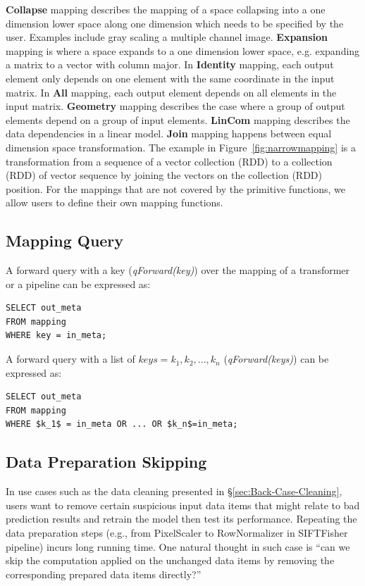 \documentclass{sig-alternate}
\begin{document}
{\bf Collapse} mapping describes the mapping of a space collapsing into a one dimension lower space along one dimension which needs
to be specified by the user. Examples include gray scaling a multiple channel image.
{\bf Expansion} mapping is where a space expands to a one dimension lower space, e.g. expanding a matrix to a vector with column major.
In {\bf Identity} mapping, each output element only depends on one element with the same coordinate in the input matrix.
In {\bf All} mapping, each output element depends on all elements in the input matrix.
{\bf Geometry} mapping describes the case where a group of output elements depend on a group of input elements.
{\bf LinCom} mapping describes the data dependencies in a linear model.
{\bf Join} mapping happens between equal dimension space transformation. The example in Figure~\ref{fig:narrowmapping} 
is a transformation from a sequence of a vector collection (RDD) to a collection (RDD) of vector sequence by joining the vectors
on the collection (RDD) position.
For the mappings that are not covered by the primitive functions, we allow users to define their own mapping functions.

\subsection{Mapping Query}
A forward query with a key  ({\it qForward(key)}) over the mapping of a transformer or a pipeline can be expressed as:
\begin{lstlisting}
SELECT out_meta
FROM mapping
WHERE key = in_meta;
\end{lstlisting}

A forward query with a list of $keys={k_1, k_2, ..., k_n}$ ({\it qForward(keys)}) can be expressed as:
\begin{lstlisting}
SELECT out_meta
FROM mapping
WHERE $k_1$ = in_meta OR ... OR $k_n$=in_meta;
\end{lstlisting}

\subsection{Data Preparation Skipping}
\label{sec:formal-skipping}
In use cases such as the data cleaning presented in \S\ref{sec:Back-Case-Cleaning}, users want
to remove certain suspicious input data items that might relate to bad prediction results and retrain the model then
test its performance. 
Repeating the data preparation steps (e.g., from PixelScaler to RowNormalizer in SIFTFisher pipeline) incurs
long running time.
One natural thought in such case is ``can we skip the computation applied on the unchanged data items by removing
the corresponding prepared data items directly?''
\end{document}
